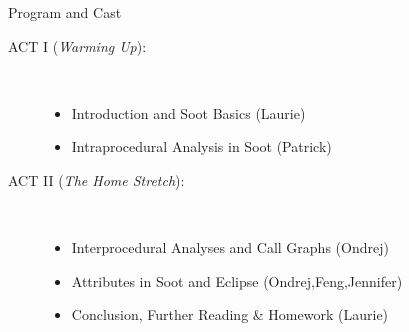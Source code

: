 \begin{slide}{Program and Cast}
\begin{description}
\item[ACT I ({\em Warming Up}):] \hspace{1in} \\
\begin{itemize}
\item Introduction and Soot Basics {\blue (Laurie)}
\item Intraprocedural Analysis in Soot {\blue (Patrick)}
\end{itemize}
\item[ACT II ({\em The Home Stretch}):] \hspace{1in} \\
\begin{itemize}
\item Interprocedural Analyses and Call Graphs {\blue (Ondrej)}
\item Attributes in Soot and Eclipse {\blue (Ondrej,Feng,Jennifer)}
\item {\red Conclusion, Further Reading \& Homework {\blue (Laurie)}}
\end{itemize}
\end{description}
\end{slide}
